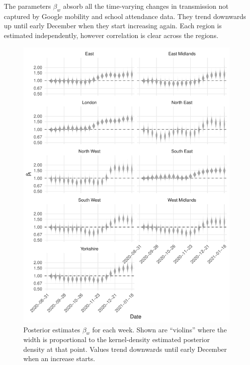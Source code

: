 \documentclass[thesis.tex]{subfiles}
\begin{document}


The parameters $\beta_w$ absorb all the time-varying changes in transmission not captured by Google mobility and school attendance data.
They trend downwards up until early December when they start increasing again.
Each region is estimated independently, however correlation is clear across the regions.

\begin{figure}
    \includegraphics{SEIR/CIS/beta_walk}
    \caption[Posterior estimates of $\beta_w$]{%
        Posterior estimates $\beta_w$ for each week.
        Shown are ``violins'' where the width is proportional to the kernel-density estimated posterior density at that point.
        Values trend downwards until early December when an increase starts.
    }
    \label{SEIR:fig:beta-walk}
\end{figure}
\end{document}
